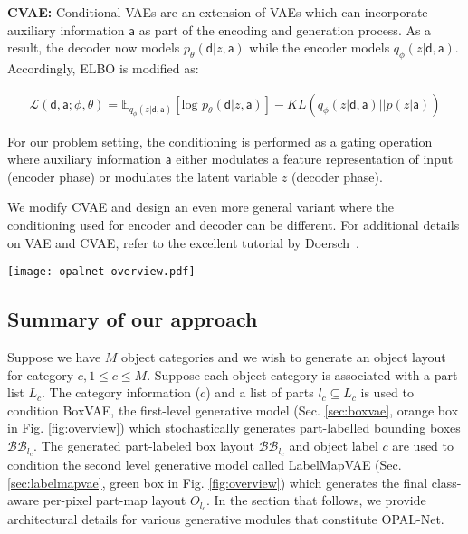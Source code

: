 \documentclass[runningheads]{llncs}
\begin{document}
\noindent \textbf{CVAE:} Conditional VAEs are an extension of VAEs which can incorporate auxiliary information $\mathsf{a}$ as part of the encoding and generation process. As a result, the decoder now models $p_{\theta}(\mathsf{d}|z,\mathsf{a})$ while the encoder models $q_{\phi}(z|\mathsf{d},\mathsf{a})$. Accordingly, ELBO is modified as:

\begin{align}
\mathcal{L}(\mathsf{d,a};\phi,\theta) = \mathbb{E}_{q_{\phi}(z|\mathsf{d,a})} [\text{log } p_{\theta}(\mathsf{d}|z,\mathsf{a})] - KL(q_{\phi}(z|\mathsf{d,a})\lvert \lvert p(z|\mathsf{a}))
\end{align}

\noindent For our problem setting, the conditioning is performed as a gating operation where auxiliary information $\mathsf{a}$ either modulates a feature representation of input (encoder phase) or modulates the latent variable $z$ (decoder phase).

We modify CVAE and design an even more general variant where the conditioning used for encoder and decoder can be different. For additional details on VAE and CVAE, refer to the excellent tutorial by Doersch~\cite{doersch2016tutorial}.

\begin{figure*}[!tbp]
  \centering
  \texttt{[image: opalnet-overview.pdf]}
  \caption{An illustration of the proposed hierarchical approach for object layout generation. Given an object label $c$ and a list of plausible object parts $l_c$, a bounding box layout of the object ${BB}_{l_c}$ is stochastically generated by BoxVAE (Sec. \ref{sec:boxvae}). The part-labelled bounding box layout is used by LabelMapVAE module (Sec. \ref{sec:labelmapvae}) to guide the stochastic generation of the final object layout $O_{l_c}$. The black-red circles indicate conditioning using object attributes during generation.}
  \label{fig:overview}
\end{figure*}

\subsection{Summary of our approach}
\label{sec:approachsummary}

Suppose we have $M$ object categories and we wish to generate an object layout for category $c,1 \leqslant c \leqslant M$. Suppose  each object category is associated with a part list $L_c$. The category information ($c$) and a list of parts $l_c \subseteq L_c$ is used to condition BoxVAE, the first-level generative model (Sec. \ref{sec:boxvae}, orange box in Fig. \ref{fig:overview}) which stochastically generates part-labelled bounding boxes $\mathcal{BB}_{l_c}$. The generated part-labeled box layout $\mathcal{BB}_{l_c}$ and object label $c$ are used to condition the second level generative model called LabelMapVAE (Sec. \ref{sec:labelmapvae}, green box in Fig. \ref{fig:overview}) which generates the final class-aware per-pixel part-map layout $O_{l_c}$. In the section that follows, we provide architectural details for various generative modules that constitute OPAL-Net.
\end{document}

